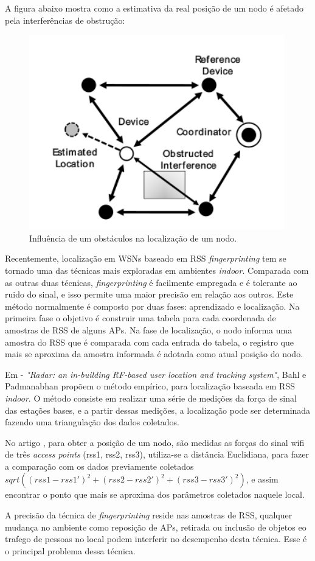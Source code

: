A figura abaixo mostra como a estimativa da real posição de um nodo é afetado pela interferências de obstrução:
	\begin{figure}[ht]
	\centering
	\includegraphics[scale=0.5]{images/rsserror.png}
	\caption{Influência de um obstáculos na localização de um nodo\cite{rss1}. }
	\label{fig:rsserror}
	\end{figure}
	
	Recentemente, localização em WSNs baseado em RSS \textit{fingerprinting} tem se tornado uma das técnicas mais exploradas 
	em ambientes \textit{indoor}\cite{fingerPrint}\cite{wifiRadar}\cite{fingerPrint2}. Comparada com as outras duas técnicas, \textit{fingerprinting} é facilmente empregada 
	e é tolerante ao ruido do sinal, e isso permite uma maior precisão em relação aos outros. Este método normalmente é composto por duas fases: 
	aprendizado e localização. Na primeira fase o objetivo é construir uma tabela para cada coordenada de amostras de RSS 
	de alguns APs. Na fase de localização, o nodo informa uma amostra do RSS que é comparada com cada entrada do tabela, o registro
	que mais se aproxima da amostra informada é adotada como atual posição do nodo.
	
   Em \cite{wifiRadar} - \textit{"Radar: an in-building RF-based user location and tracking system"}, Bahl e Padmanabhan propõem o método empírico,
   para localização baseada em RSS \textit{indoor}. O método consiste em realizar uma série de medições da força de sinal das estações bases, 
   e a partir dessas medições, a localização pode ser determinada fazendo uma triangulação dos dados coletados. 

  No artigo \cite{wifiRadar}, para obter a posição de um nodo, são medidas as forças do sinal wifi de três \textit{access points} (rss1, rss2, rss3), 
utiliza-se a distância Euclidiana, para fazer a comparação com os dados previamente coletados $sqrt((rss1-rss1')^{2}+(rss2-rss2')^{2}+(rss3-rss3')^{2})$, 
e assim encontrar o ponto que mais se aproxima dos parâmetros coletados naquele local. 
	
	A precisão da técnica de \textit{fingerprinting} reside nas amostras de RSS, qualquer mudança no ambiente como 
	reposição de APs, retirada ou inclusão de objetos eo trafego de pessoas no local podem interferir no desempenho desta técnica. 
	Esse é o principal problema dessa técnica.


